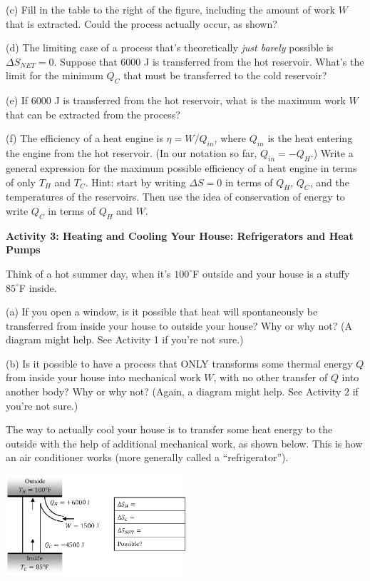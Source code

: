 (c) Fill in the table to the right of the figure, including the amount of work $W$ that is extracted.  Could the process actually occur, as shown?
\answerspace{0.2 in}

(d) The limiting case of a process that's theoretically \textit{just barely} possible is $\Delta S_{NET} = 0$.  Suppose that 6000 J is transferred from the hot reservoir.  What's the limit for the minimum $Q_C$ that must be transferred to the cold reservoir?
\answerspace{0.4 in}

(e) If  6000 J is transferred from the hot reservoir, what is the maximum work $W$ that can be extracted from the process?
\answerspace{0.4 in}

\pagebreak[2]
(f) The efficiency of a heat engine is $\eta=W/Q_{in}$, where $Q_{in}$ is the heat entering the engine from the hot reservoir.  (In our notation so far, $Q_{in}=-Q_H$.)  Write a general expression for the maximum possible efficiency of a heat engine in terms of only $T_H$ and $T_C$.  Hint: start by writing $\Delta S = 0$ in terms of $Q_H$, $Q_C$, and the temperatures of the reservoirs.  Then use the idea of conservation of energy to write $Q_C$ in terms of $Q_H$ and $W$.
\answerspace{1.5 in}

\textbf{Activity 3: Heating and Cooling Your House: Refrigerators and Heat Pumps}

Think of a hot summer day, when it's $100^\circ$F outside and your house is a stuffy $85^\circ$F inside.  

(a) If you open a window, is it possible that heat will spontaneously be transferred from inside your house to outside your house?  Why or why not?  (A diagram might help.  See Activity 1 if you're not sure.)
\answerspace{1.2 in}

(b) Is it possible to have a process that ONLY transforms some thermal energy $Q$ from inside your house into mechanical work $W$, with no other transfer of $Q$ into another body?  Why or why not?  (Again, a diagram might help.  See Activity 2 if you're not sure.)
\answerspace{1.2 in}

The way to actually cool your house is to transfer some heat energy to the outside with the help of additional mechanical work, as shown below.  This is how an air conditioner works (more generally called a ``refrigerator'').

\begin{center}
\vspace{-0.3 in}
\includegraphics[width=0.5\textwidth]{entropy_is_it_possible/fig6.eps}
\vspace{-0.4 in}
\end{center}

